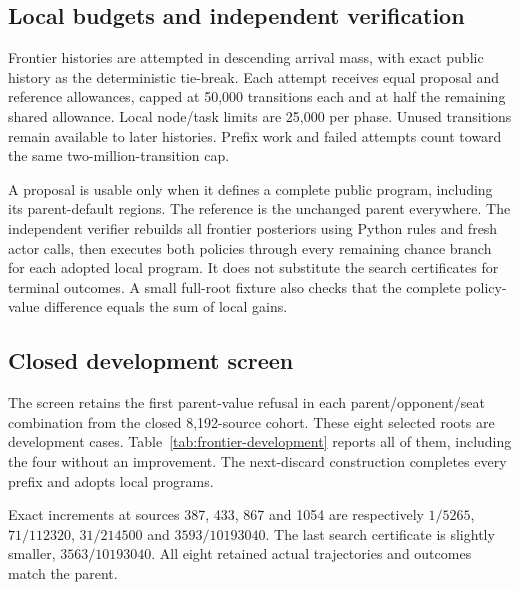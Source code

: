 \subsection{Local budgets and independent verification}
Frontier histories are attempted in descending arrival mass, with exact public
history as the deterministic tie-break. Each attempt receives equal proposal
and reference allowances, capped at 50,000 transitions each and at half the
remaining shared allowance. Local node/task limits are 25,000 per phase.
Unused transitions remain available to later histories. Prefix work and failed
attempts count toward the same two-million-transition cap.

A proposal is usable only when it defines a complete public program, including
its parent-default regions. The reference is the unchanged parent everywhere.
The independent verifier rebuilds all frontier posteriors using Python rules
and fresh actor calls, then executes both policies through every remaining
chance branch for each adopted local program. It does not substitute the
search certificates for terminal outcomes. A small full-root fixture also
checks that the complete policy-value difference equals the sum of local gains.

\subsection{Closed development screen}
The screen retains the first parent-value refusal in each parent/opponent/seat
combination from the closed 8,192-source cohort. These eight selected roots
are development cases. Table~\ref{tab:frontier-development} reports all of them,
including the four without an improvement. The next-discard construction
completes every prefix and adopts \FrontierAdoptedNodes{} local programs.

\begin{table}[htbp]
\centering\small

\caption{Complete next-discard development screen. Gains are conditional
win-score increments at the selected roots, in percentage points. Cutoff is
the number of draws remaining at the frontier. Independent full local values
give the exact column; the lower column uses the search certificates.}
\label{tab:frontier-development}
\end{table}

Exact increments at sources 387, 433, 867 and 1054 are respectively
$1/5265$, $71/112320$, $31/214500$ and $3593/10193040$.
The last search certificate is slightly smaller, $3563/10193040$.
All eight retained actual trajectories and outcomes match the parent.

